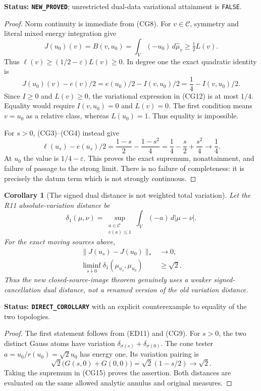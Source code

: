 \documentclass[11pt,a4paper]{article}
\numberwithin{equation}{section}
\newtheorem{corollary}[theorem]{Corollary}
\theoremstyle{definition}
\theoremstyle{remark}
\begin{document}
\noindent\textbf{Status: \texttt{NEW\_PROVED}}; unrestricted
dual-data variational attainment is \texttt{FALSE}.

\begin{proof}
Norm continuity is immediate from (CG8). For $v\in\mathscr C$,
symmetry and literal mixed energy integration give
\[
        J(u_0)(v)=B(v,u_0)=\int_V(-u_0)\,d\widehat\mu_v
                          \geq\tfrac12 L(v).
\]
Thus $\ell(v)\geq(1/2-\varepsilon)L(v)\geq0$.
In degree one the exact quadratic identity is
\[
 J(u_0)(v)-e(v)/2
                =e(u_0)/2-I(v,u_0)/2
                =\frac14-I(v,u_0)/2.
 \tag{CG13}
\]
Since $I\geq0$ and $L(v)\geq0$, the variational expression
in (CG12) is at most $1/4$. Equality would require
$I(v,u_0)=0$ and $L(v)=0$. The first condition means
$v=u_0$ as a relative class, whereas $L(u_0)=1$.
Thus equality is impossible.

For $s>0$, (CG3)--(CG4) instead give
\[
      \ell(u_s)-e(u_s)/2
            =\frac{1-s}{2}-\frac{1-s^2}{4}
            =\frac14-\frac s2+\frac{s^2}{4}
                      \longrightarrow\frac14.
 \tag{CG14}
\]
At $u_0$ the value is $1/4-\varepsilon$. This proves the
exact supremum, nonattainment, and failure of passage to the
strong limit. There is no failure of completeness: it is
precisely the datum term which is not strongly continuous.
\end{proof}

\begin{corollary}[The signed dual distance is not weighted total variation]
\label{cor:r12-dual-versus-variation}
Let the R11 absolute-variation distance be
\[
 \delta_1(\mu,\nu)
     =\sup_{\substack{a\in\mathscr C\\e(a)\leq1}}
                     \int_V(-a)\,d|\mu-\nu|.
 \tag{CG15}
\]
For the exact moving sources above,
\[
 \begin{split}
  \|J(u_s)-J(u_0)\|_*&\longrightarrow0,\\
  \liminf_{s\downarrow0}\delta_1(\mu_{u_s},\mu_{u_0})
                                                  &\geq\sqrt2.
 \end{split}
 \tag{CG16}
\]
Thus the new closed-source-image theorem genuinely uses a
weaker signed-cancellation dual distance, not a renamed
version of the old variation distance.
\end{corollary}

\noindent\textbf{Status: \texttt{DIRECT\_COROLLARY}} with
an explicit counterexample to equality of the two topologies.

\begin{proof}
The first statement follows from (ED11) and (CG9). For $s>0$,
the two distinct Gauss atoms have variation
$\delta_{\sigma(s)}+\delta_{\sigma(0)}$. The cone tester
$a=u_0/r(u_0)=\sqrt2u_0$ has energy one. Its variation pairing
is
\[
            \sqrt2\bigl(G(s,0)+G(0,0)\bigr)
                         =\sqrt2(1-s/2)\longrightarrow\sqrt2.
\]
Taking the supremum in (CG15) proves the assertion. Both
distances are evaluated on the same allowed analytic annulus
and original measures.
\end{proof}
\end{document}

